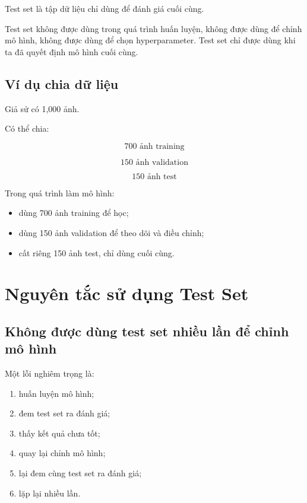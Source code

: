 Test set là tập dữ liệu chỉ dùng để đánh giá cuối cùng.

\begin{canhbao}
Test set không được dùng trong quá trình huấn luyện, không được dùng để chỉnh mô hình, không được dùng để chọn hyperparameter. Test set chỉ được dùng khi ta đã quyết định mô hình cuối cùng.
\end{canhbao}

\subsection{Ví dụ chia dữ liệu}

Giả sử có 1,000 ảnh.

Có thể chia:

\[
    700 \text{ ảnh training}
\]

\[
    150 \text{ ảnh validation}
\]

\[
    150 \text{ ảnh test}
\]

Trong quá trình làm mô hình:

\begin{itemize}
    \item dùng 700 ảnh training để học;
    \item dùng 150 ảnh validation để theo dõi và điều chỉnh;
    \item cất riêng 150 ảnh test, chỉ dùng cuối cùng.
\end{itemize}

\section{Nguyên tắc sử dụng Test Set}

\subsection{Không được dùng test set nhiều lần để chỉnh mô hình}

Một lỗi nghiêm trọng là:

\begin{enumerate}
    \item huấn luyện mô hình;
    \item đem test set ra đánh giá;
    \item thấy kết quả chưa tốt;
    \item quay lại chỉnh mô hình;
    \item lại đem cùng test set ra đánh giá;
    \item lặp lại nhiều lần.
\end{enumerate}

